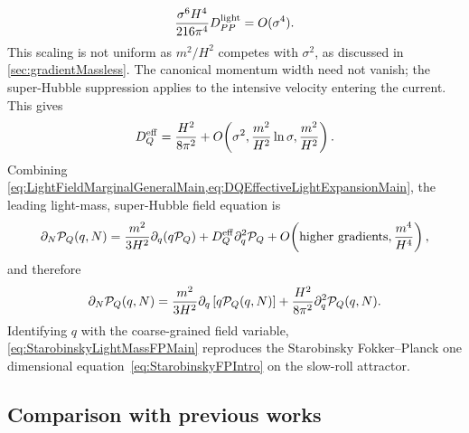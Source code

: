 \documentclass{article}
\numberwithin{equation}{section}
\begin{document}
	\begin{equation}
		\frac{\sigma^6H^4}{216\pi^4}D_{PP}^{\rm light}
		=
		O(\sigma^4).
		\label{eq:VelocityWidthScalingMain}
	\end{equation}
	This scaling is not uniform as $m^2/H^2$ competes with $\sigma^2$, as discussed in \cref{sec:gradientMassless}. The canonical momentum width need not vanish; the super-Hubble suppression applies to the intensive velocity entering the current.
	This gives
	\begin{equation}
		D_Q^{\rm eff}
		=
		\frac{H^2}{8\pi^2}
		+
		O\!\left(
		\sigma^2,
		\frac{m^2}{H^2}\ln\sigma,
		\frac{m^2}{H^2}
		\right).
		\label{eq:DQEffectiveLightExpansionMain}
	\end{equation}
	Combining \cref{eq:LightFieldMarginalGeneralMain,eq:DQEffectiveLightExpansionMain}, the leading light-mass, super-Hubble field equation is
	\begin{align}
		\partial_N{\cal P}_Q(q,N)
		=
		\frac{m^2}{3H^2}\partial_q\!\left(q{\cal P}_Q\right)
		+
		D_Q^{\rm eff}\partial_q^2{\cal P}_Q
		+
		O\!\left(
		\text{higher gradients},
		\frac{m^4}{H^4}
		\right),
		\label{eq:StarobinskyDiffusionFromReductionMain}
	\end{align}
	and therefore
	\begin{equation}
		\partial_N{\cal P}_Q(q,N)
		=
		\frac{m^2}{3H^2}
		\partial_q \left[q{\cal P}_Q(q,N)\right]
		+
		\frac{H^2}{8\pi^2}
		\partial_q^2{\cal P}_Q(q,N).
		\label{eq:StarobinskyLightMassFPMain}
	\end{equation}
    Identifying $q$ with the coarse-grained field variable, \cref{eq:StarobinskyLightMassFPMain} reproduces the Starobinsky Fokker--Planck one dimensional equation~\eqref{eq:StarobinskyFPIntro} on the slow-roll attractor.

	\subsection{Comparison with previous works}
	\label{sec:similar_works_comparison}
\end{document}
